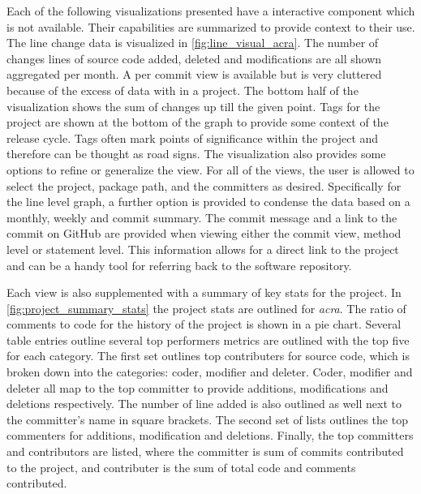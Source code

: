Each of the following visualizations presented have a interactive component which is not available. Their capabilities are summarized to provide context to their use. The line change data is visualized in \autoref{fig:line_visual_acra}. The number of changes lines of source code added, deleted and modifications are all shown aggregated per month. A per commit view is available but is very cluttered because of the excess of data with in a project. The bottom half of the visualization shows the sum of changes up till the given point. Tags for the project are shown at the bottom of the graph to provide some context of the release cycle. Tags often mark points of significance within the project and therefore can be thought as road signs. The visualization also provides some options to refine or generalize the view. For all of the views, the user is allowed to select the project, package path, and the committers as desired. Specifically for the line level graph, a further option is provided to condense the data based on a monthly, weekly and commit summary. The commit message and a link to the commit on GitHub are provided when viewing either the commit view, method level or statement level. This information allows for a direct link to the project and can be a handy tool for referring back to the software repository.

Each view is also supplemented with a summary of key stats for the project. In \autoref{fig:project_summary_stats} the project stats are outlined for \textit{acra}. The ratio of comments to code for the history of the project is shown in a pie chart. Several table entries outline several top performers metrics are outlined with the top five for each category. The first set outlines top contributers for source code, which is broken down into the categories: coder, modifier and deleter. Coder, modifier and deleter all map to the top committer to provide additions, modifications and deletions respectively. The number of line added is also outlined as well next to the committer's name in square brackets. The second set of lists outlines the top commenters for additions, modification and deletions. Finally, the top committers and contributors are listed, where the committer is sum of commits contributed to the project, and contributer is the sum of total code and comments contributed.



